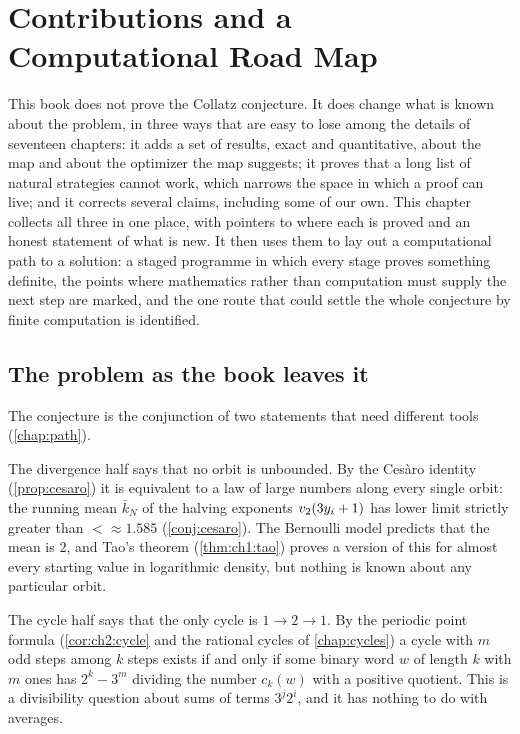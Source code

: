 \chapter{Contributions and a Computational Road Map}\label{chap:synthesis}

This book does not prove the Collatz conjecture. It does change what is known
about the problem, in three ways that are easy to lose among the details of
seventeen chapters: it adds a set of results, exact and quantitative, about the
map and about the optimizer the map suggests; it proves that a long list of
natural strategies cannot work, which narrows the space in which a proof can
live; and it corrects several claims, including some of our own. This chapter
collects all three in one place, with pointers to where each is proved and an
honest statement of what is new. It then uses them to lay out a computational
path to a solution: a staged programme in which every stage proves something
definite, the points where mathematics rather than computation must supply
the next step are marked, and the one route that could settle the whole
conjecture by finite computation is identified.

\section{The problem as the book leaves it}\label{sec:ch10d:state}

The conjecture is the conjunction of two statements that need different tools
(\cref{chap:path}).

The divergence half says that no orbit is unbounded. By the Ces\`aro identity
(\cref{prop:cesaro}) it is equivalent to a law of large numbers along every
single orbit: the running mean $\bar k_N$ of the halving exponents
$v_2(3y_i+1)$ has lower limit strictly greater than $\lt\approx1.585$
(\cref{conj:cesaro}). The Bernoulli model predicts that the mean is $2$, and
Tao's theorem (\cref{thm:ch1:tao}) proves a version of this for almost every
starting value in logarithmic density, but nothing is known about any
particular orbit.

The cycle half says that the only cycle is $1\to2\to1$. By the periodic point formula
(\cref{cor:ch2:cycle} and the rational cycles of \cref{chap:cycles}) a cycle with $m$ odd steps among $k$ steps exists if and only
if some binary word $w$ of length $k$ with $m$ ones has $2^k-3^m$ dividing the
number $c_k(w)$ with a positive quotient. This is a divisibility question
about sums of terms $3^j2^i$, and it has nothing to do with averages.

